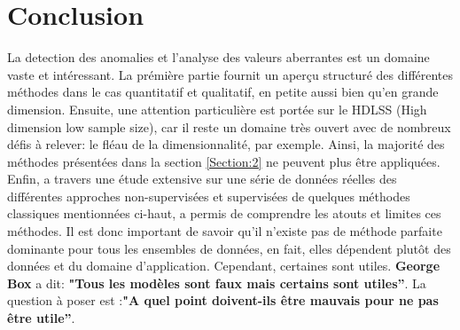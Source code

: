 
\section{Conclusion}
La detection des anomalies et l'analyse  des valeurs aberrantes est un domaine vaste et intéressant. La prémière partie fournit un aperçu structuré des différentes méthodes dans le cas quantitatif et qualitatif, en petite aussi bien qu'en grande dimension. Ensuite, une attention particulière est portée sur le HDLSS (High dimension low
sample size), car il reste un domaine très ouvert avec de nombreux défis à relever: le fléau de la dimensionnalité, par exemple. Ainsi, la majorité des méthodes présentées dans la section \ref{Section:2} ne peuvent plus être appliquées. 
Enfin, a travers une étude extensive sur une série de données réelles des différentes approches non-supervisées  et supervisées de quelques méthodes classiques  mentionnées ci-haut, a permis de comprendre les atouts et limites ces méthodes.  Il est  donc important de savoir qu'il n'existe pas de méthode parfaite dominante pour tous les ensembles de données, en fait, elles dépendent plutôt des données et du domaine d'application. Cependant, certaines sont utiles. \textbf{George Box} a dit: \textbf{"Tous les modèles sont faux mais certains sont utiles”}. La question à poser est :\textbf{"A quel point doivent-ils être mauvais pour ne pas être utile”}.



